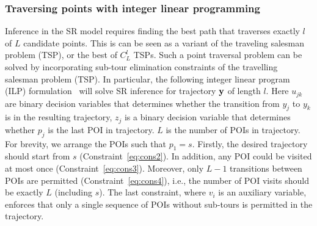 \subsubsection{Traversing points with integer linear programming}
Inference in the SR model requires finding the best path that traverses exactly $l$ of $L$ candidate points. 
This is can be seen as a variant of the traveling salesman problem (TSP), or the best of $C_L^l$ TSPs.
Such a point traversal problem can be solved by incorporating 
sub-tour elimination constraints of the travelling salesman problem (TSP).
In particular, the following integer linear program (ILP) formulation~\cite{ijcai15,cikm16paper} 
will solve SR inference for trajectory $\mathbf{y}$ of length $l$. 
Here $u_{jk}$ are binary decision variables that determines whether the transition from $y_j$ to $y_k$ is in the resulting trajectory,
$z_j$ is a binary decision variable that determines whether $p_j$ is the last POI in trajectory.
$L$ is the number of POIs in trajectory.
For brevity, we arrange the POIs such that $p_1 = s$.
Firstly, the desired trajectory should start from $s$ (Constraint~\ref{eq:cons2}).
In addition, any POI could be visited at most once (Constraint~\ref{eq:cons3}).
Moreover, only $L-1$ transitions between POIs are permitted (Constraint~\ref{eq:cons4}),
i.e., the number of POI visits should be exactly $L$ (including $s$).
The last constraint, where $v_i$ is an auxiliary variable,
enforces that only a single sequence of POIs without sub-tours is permitted in the trajectory.

